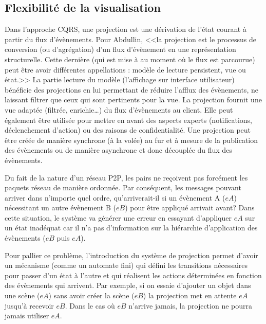 \subsection{Flexibilité de la visualisation}
\label{sec:flexviz}
Dans l'approche \gls{CQRS}, une projection est une dérivation de l'état courant à 
partir du flux d'évènements. Pour Abdullin, <<la projection est le processus de 
conversion (ou d'agrégation) d'un flux d'évènement en une représentation 
structurelle. Cette dernière (qui est mise à au moment où le flux est parcourue) 
peut être avoir différentes appellations : modèle de lecture persistent, vue ou 
état.>>
La partie lecture du modèle (l'affichage sur interface utilisateur) bénéficie des 
projections en lui permettant de réduire l'afflux des évènements, ne laissant filtrer 
que ceux qui sont pertinents pour la vue. La projection fournit une vue adaptée 
(filtrée, enrichie\ldots) du flux d'évènements au client. Elle peut également être 
utilisée pour mettre en avant des aspects experts (notifications, déclenchement 
d'action) ou des raisons de confidentialité.
Une projection peut être créée de manière synchrone (à la volée) au fur et à 
mesure de la publication des évènements ou de manière asynchrone et donc 
découplée du flux des évènements. 


Du fait de la nature d'un réseau \gls{P2P}, les pairs ne reçoivent pas forcément les 
paquets réseau de manière ordonnée.
Par conséquent, les messages pouvant arriver dans n'importe quel ordre, 
qu'arriverait-il si un évènement A ($eA$) nécessitant un autre évènement B ($eB$) 
pour être appliqué arrivait avant? Dans cette situation, le système va générer une 
erreur en essayant d'appliquer $eA$ sur un état inadéquat car il n'a pas 
d'information sur la hiérarchie d'application des évènements ($eB$ puis $eA$).

Pour pallier ce problème, l'introduction du système de projection permet d'avoir un 
mécanisme (comme un automate fini) qui défini les transitions nécessaires pour 
passer d'un état à l'autre et qui réalisent les actions déterminées en fonction des 
évènements qui arrivent. Par exemple, si on essaie d'ajouter un objet dans une 
scène  ($eA$) sans avoir créer la scène ($eB$) la projection met en attente $eA$ 
jusqu'à recevoir $eB$. Dans le cas où $eB$ n'arrive jamais, la projection ne pourra 
jamais utiliser $eA$.


